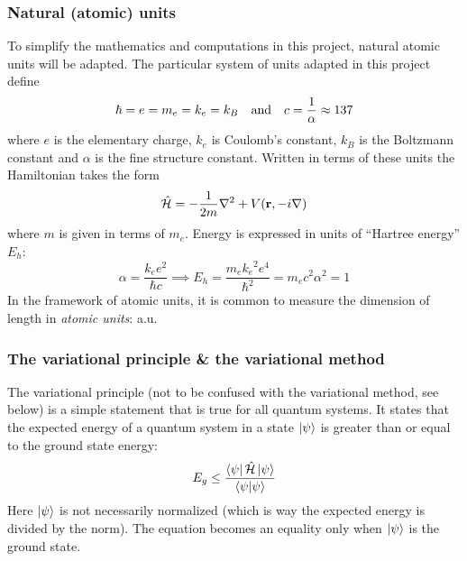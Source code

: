 \documentclass[nofootinbib,reprint,english]{revtex4-1}
\newcommand{\hatHH}{\hat{\mathcal{H}}}
\begin{document}
\subsubsection{Natural (atomic) units}
To simplify the mathematics and computations in this project, natural atomic units will be adapted. The particular system of units adapted in this project define
\begin{equation}
\hbar=e=m_e=k_e=k_B\qand c=\frac{1}{\alpha}\approx137
\end{equation}
where \(e\) is the elementary charge, \(k_e\) is Coulomb's constant, \(k_B\) is the Boltzmann constant and \(\alpha\) is the fine structure constant. Written in terms of these units the Hamiltonian takes the form
\begin{equation}
\hatHH=-\frac{1}{2m}\nabla^2+V(\vb{r},-i\nabla)
\end{equation}
where \(m\) is given in terms of \(m_e\). Energy is expressed in units of ``Hartree energy'' \(E_h\):
\[\alpha=\frac{k_ee^2}{\hbar c}\implies E_h=\frac{m_e{k_e}^2e^4}{\hbar^2}=m_ec^2\alpha^2=1\]
In the framework of atomic units, it is common to measure the dimension of length in \emph{atomic units}: a.u.
\subsubsection{The variational principle \& the variational method}
The variational principle (not to be confused with the variational method, see below) is a simple statement that is true for all quantum systems. It states that the expected energy of a quantum system in a state \(\ket{\psi}\) is greater than or equal to the ground state energy:
\begin{equation}\label{eq:variational_principle}
E_g\leq\frac{\bra{\psi}\hatHH\ket{\psi}}{\braket{\psi}}
\end{equation}
Here \(\ket{\psi}\) is not necessarily normalized (which is way the expected energy is divided by the norm). The equation becomes an equality only when \(\ket{\psi}\) is the ground state. 
\end{document}
